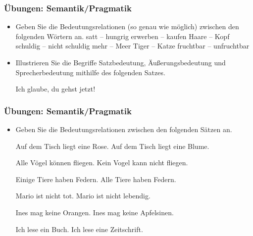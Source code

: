 \begin{frame}
\frametitle{Übungen: Semantik/Pragmatik}

\begin{itemize}
	\item Geben Sie die Bedeutungsrelationen (so genau wie möglich) zwischen den folgenden Wörtern an.
	\eal
	\ex satt -- hungrig
	\ex erwerben -- kaufen
	\ex Haare -- Kopf
	\ex schuldig -- nicht schuldig
	\ex mehr -- Meer
	\ex Tiger -- Katze
	\ex fruchtbar -- unfruchtbar
	\zl
	
	\item Illustrieren Sie die Begriffe Satzbedeutung, Äußerungsbedeutung und Sprecherbedeutung mithilfe des folgenden Satzes.
	
	\ea Ich glaube, du gehst jetzt!
	\z
	
\end{itemize}

\end{frame}


\begin{frame}
\frametitle{Übungen: Semantik/Pragmatik}

\begin{itemize}
	\item Geben Sie die Bedeutungsrelationen zwischen den folgenden Sätzen an.
	
	\eal 
	\ex Auf dem Tisch liegt eine Rose.
	\ex Auf dem Tisch liegt eine Blume.
	\zl
	
	\eal 
	\ex Alle Vögel können fliegen.
	\ex Kein Vogel kann nicht fliegen.
	\zl
	
	\eal 
	\ex Einige Tiere haben Federn.
	\ex Alle Tiere haben Federn.
	\zl
	
	\eal 
	\ex Mario ist nicht tot.
	\ex Mario ist nicht lebendig.
	\zl
	
	\eal 
	\ex Ines mag keine Orangen.
	\ex Ines mag keine Apfelsinen.
	\zl
	
	\eal 
	\ex Ich lese ein Buch.
	\ex Ich lese eine Zeitschrift.
	\zl
	
\end{itemize}

\end{frame}



